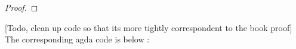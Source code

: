 \begin{proof}
\end{proof}


[Todo, clean up code so that its more tightly correspondent to the book proof]
The corresponding agda code is below :

